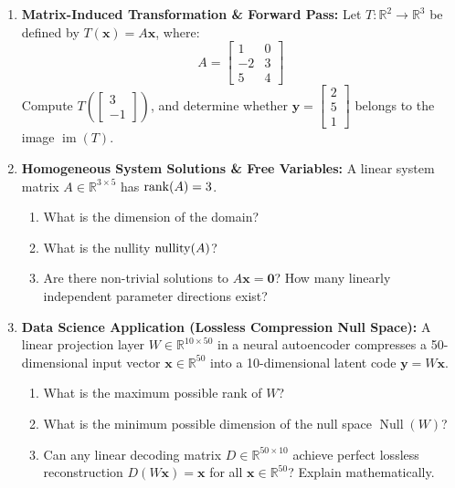 \begin{enumerate}
\item \textbf{Matrix-Induced Transformation \& Forward Pass:} Let $T: \mathbb{R}^2 \to \mathbb{R}^3$ be defined by $T(\mathbf{x}) = A \mathbf{x}$, where:
\begin{equation*}
A = \begin{bmatrix} 1 & 0 \\ -2 & 3 \\ 5 & 4 \end{bmatrix}
\end{equation*}
Compute $T\left(\begin{bmatrix} 3 \\ -1 \end{bmatrix}\right)$, and determine whether $\mathbf{y} = \begin{bmatrix} 2 \\ 5 \\ 1 \end{bmatrix}$ belongs to the image $\operatorname{im}(T)$.

\item \textbf{Homogeneous System Solutions \& Free Variables:} A linear system matrix $A \in \mathbb{R}^{3 \times 5}$ has $\operatorname{rank}(A) = 3$.
\begin{enumerate}
    \item What is the dimension of the domain?
    \item What is the nullity $\operatorname{nullity}(A)$?
    \item Are there non-trivial solutions to $A \mathbf{x} = \mathbf{0}$? How many linearly independent parameter directions exist?
\end{enumerate}

\item \textbf{Data Science Application (Lossless Compression Null Space):} A linear projection layer $W \in \mathbb{R}^{10 \times 50}$ in a neural autoencoder compresses a 50-dimensional input vector $\mathbf{x} \in \mathbb{R}^{50}$ into a 10-dimensional latent code $\mathbf{y} = W \mathbf{x}$.
\begin{enumerate}
    \item What is the maximum possible rank of $W$?
    \item What is the minimum possible dimension of the null space $\operatorname{Null}(W)$?
    \item Can any linear decoding matrix $D \in \mathbb{R}^{50 \times 10}$ achieve perfect lossless reconstruction $D(W\mathbf{x}) = \mathbf{x}$ for all $\mathbf{x} \in \mathbb{R}^{50}$? Explain mathematically.
\end{enumerate}
\end{enumerate}

